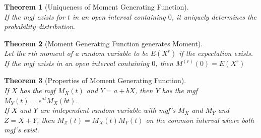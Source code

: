 \documentclass[12pt]{article}
\newtheorem{theorem}{Theorem}[section]
\theoremstyle{definition}
\begin{document}
\begin{theorem}[Uniqueness of Moment Generating Function]
\hfill\\\normalfont If the mgf exists for $t$ in an open interval containing $0$, it uniquely determines the probability distribution.
\end{theorem}
\begin{theorem}[Moment Generating Function generates Moment]
\hfill\\\normalfont Let the $r$th moment of a random variable to be $E(X^r)$ if the expectation exists. If the mgf exists in an open interval containing $0$, then 
$
M^{(r)}(0) = E(X^r)
$
\end{theorem}
\begin{theorem}[Properties of Moment Generating Function]
\hfill\\\normalfont If $X$ has the mgf $M_X(t)$ and $Y=a+bX$, then $Y$ has the mgf $M_Y(t) = e^{at}M_X(bt)$.\\

If $X$ and $Y$ are independent random variable with mgf's $M_X$ and $M_Y$ and $Z=X+Y$, then
$
M_Z(t) = M_X(t)M_Y(t)
$
on the common interval where both mgf's exist.
\end{theorem}
\end{document}

